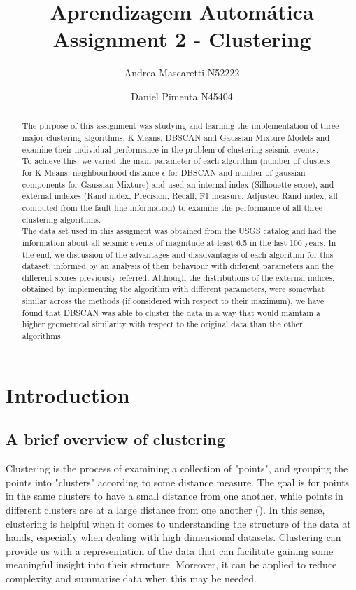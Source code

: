 \documentclass[a4paper]{article}
\title{\textbf{Aprendizagem Autom\'{a}tica} \\
	\large Assignment 2 - Clustering}
\author{Andrea Mascaretti N52222\and Daniel Pimenta N45404}
\begin{document}
	\maketitle
	\begin{abstract}
	The purpose of this assignment was studying and learning the implementation of three major clustering algorithms: K-Means, DBSCAN and Gaussian Mixture Models and
	examine their individual performance in the problem of clustering seismic events.\\
	To achieve this, we varied the main parameter of each algorithm (number of clusters for K-Means, neighbourhood distance $\epsilon$ for DBSCAN and number of gaussian components
	for Gaussian Mixture) and used an internal index (Silhouette score), and external indexes (Rand index, Precision, Recall, F1 measure, Adjusted Rand index, all computed from the fault line information)
	to examine the performance of all three clustering algorithms.\\
	The data set used in this assigment was obtained from the USGS catalog and had the information about all seismic events of magnitude at least 6.5 in the last 100 years.
	In the end, we discussion of the advantages and disadvantages of each algorithm for this dataset, informed by an analysis of their behaviour with different parameters
	and the different scores previously referred.
	Although the distributions of the external indices, obtained by implementing the algorithm with different parameters, were somewhat similar across the methods (if considered with respect to their maximum), we have found that DBSCAN was able to cluster the data in a way that would maintain a higher geometrical similarity with respect to the original data than the other algorithms.
	\end{abstract}

	\section{Introduction}
	\subsection{A brief overview of clustering}
	Clustering is the process of examining a collection of "points", and grouping the points into "clusters" according to some distance measure. The goal is for points in the same clusters to have a small distance from one another, while points in different clusters are at a large distance from one another (\cite{9781107077232}).
	In this sense, clustering is helpful when it comes to understanding the structure of the data at hands, especially when dealing with high dimensional datasets. Clustering can provide us with a representation of the data that can facilitate gaining some meaningful insight into their structure. Moreover, it can be applied to reduce complexity and summarise data when this may be needed.\\
\end{document}
